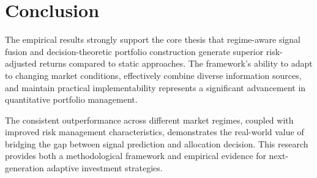 \documentclass{singlecol-new}
\theoremstyle{TH}{
\newtheorem{lemma}{Lemma}
\newtheorem{theorem}[lemma]{Theorem}
\newtheorem{corrolary}[lemma]{Corrolary}
\newtheorem{conjecture}[lemma]{Conjecture}
\newtheorem{proposition}[lemma]{Proposition}
\newtheorem{claim}[lemma]{Claim}
\newtheorem{stheorem}[lemma]{Wrong Theorem}
\newtheorem{algorithm}{Algorithm}
}
\theoremstyle{THrm}{
\newtheorem{definition}{Definition}[section]
\newtheorem{question}{Question}[section]
\newtheorem{remark}{Remark}
\newtheorem{scheme}{Scheme}
}
\theoremstyle{THhit}{
\newtheorem{case}{Case}[section]
}
\begin{document}
\section{Conclusion}

The empirical results strongly support the core thesis that regime-aware signal fusion and decision-theoretic portfolio construction generate superior risk-adjusted returns compared to static approaches. The framework's ability to adapt to changing market conditions, effectively combine diverse information sources, and maintain practical implementability represents a significant advancement in quantitative portfolio management.

The consistent outperformance across different market regimes, coupled with improved risk management characteristics, demonstrates the real-world value of bridging the gap between signal prediction and allocation decision. This research provides both a methodological framework and empirical evidence for next-generation adaptive investment strategies.




%
%
%
\end{document}
